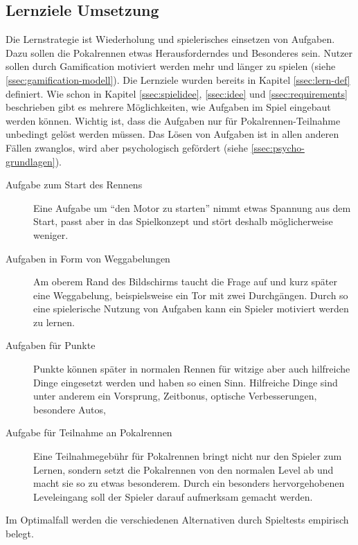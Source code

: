 \subsection{Lernziele Umsetzung}
	Die Lernstrategie ist Wiederholung und spielerisches einsetzen von Aufgaben. Dazu sollen die Pokalrennen etwas Herausforderndes und Besonderes sein. Nutzer sollen durch Gamification motiviert werden mehr und länger zu spielen (siehe \ref{ssec:gamification-modell}).
	Die Lernziele wurden bereits in Kapitel \ref{ssec:lern-def} definiert.
	Wie schon in Kapitel \ref{ssec:spielidee}, \ref{ssec:idee} und \ref{ssec:requirements} beschrieben gibt es mehrere Möglichkeiten, wie Aufgaben im Spiel eingebaut werden können. Wichtig ist, dass die Aufgaben nur für Pokalrennen-Teilnahme unbedingt gelöst werden müssen. Das Lösen von Aufgaben ist in allen anderen Fällen zwanglos, wird aber psychologisch gefördert (siehe \ref{ssec:psycho-grundlagen}).
	\begin{description}
		\item[Aufgabe zum Start des Rennens]{
			Eine Aufgabe um \enquote{den Motor zu starten} nimmt etwas Spannung aus dem Start, passt aber in das Spielkonzept und stört deshalb möglicherweise weniger.
		}
		\item[Aufgaben in Form von Weggabelungen]{
			Am oberem Rand des Bildschirms taucht die Frage auf und kurz später eine Weggabelung, beispielsweise ein Tor mit zwei Durchgängen. Durch so eine spielerische Nutzung von Aufgaben kann ein Spieler motiviert werden zu lernen.
		}
		\item[Aufgaben für Punkte]{
			Punkte können später in normalen Rennen für witzige aber auch hilfreiche Dinge eingesetzt werden und haben so einen Sinn.
			Hilfreiche Dinge sind unter anderem ein Vorsprung, Zeitbonus, optische Verbesserungen, besondere Autos,
		}
		\item[Aufgabe für Teilnahme an Pokalrennen]{
			Eine Teilnahmegebühr für Pokalrennen bringt nicht nur den Spieler zum Lernen, sondern setzt die Pokalrennen von den normalen Level ab und macht sie so zu etwas besonderem. Durch ein besonders hervorgehobenen Leveleingang soll der Spieler darauf aufmerksam gemacht werden.
		}
	\end{description}
	Im Optimalfall werden die verschiedenen Alternativen durch Spieltests empirisch belegt.


